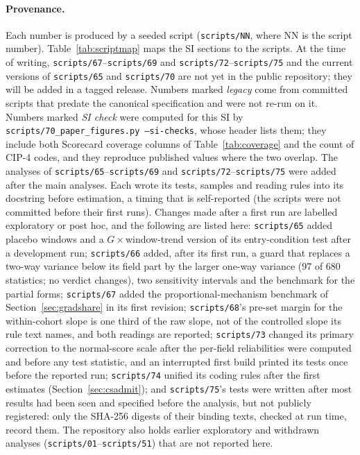 \documentclass[11pt]{article}
\newcommand{\scr}[1]{\texttt{scripts/#1}}
\begin{document}
\paragraph{Provenance.} Each number is produced by a seeded script (\scr{NN}, where NN is the script number).
Table~\ref{tab:scriptmap} maps the SI sections to the scripts. At the time of writing, \scr{67}--\scr{69} and
\scr{72}--\scr{75} and the current versions of \scr{65} and \scr{70} are not yet in the public repository; they will
be added in a tagged release. Numbers marked \emph{legacy} come from committed scripts that predate the canonical
specification and were not re-run on it. Numbers marked \emph{SI check} were computed for this SI by
\texttt{scripts/70\_paper\_figures.py --si-checks}, whose header lists them; they include both Scorecard coverage
columns of Table~\ref{tab:coverage} and the count of CIP-4 codes, and they reproduce published values where the two
overlap. The analyses of \scr{65}--\scr{69} and \scr{72}--\scr{75} were added after the main analyses. Each wrote
its tests, samples and reading rules into its docstring before estimation, a timing that is self-reported (the
scripts were not committed before their first runs). Changes made after a first run are labelled exploratory or
post hoc, and the following are listed here: \scr{65} added placebo windows and a $G\times$window-trend version of
its entry-condition test after a development run; \scr{66} added, after its first run, a guard that replaces a
two-way variance below its field part by the larger one-way variance (97 of 680 statistics; no verdict changes), two
sensitivity intervals and the benchmark for the partial forms; \scr{67} added the proportional-mechanism benchmark
of Section~\ref{sec:gradshare} in its first revision; \scr{68}'s pre-set margin for the within-cohort slope is one
third of the raw slope, not of the controlled slope its rule text names, and both readings are reported; \scr{73}
changed its primary correction to the normal-score scale after the per-field reliabilities were computed and before
any test statistic, and an interrupted first build printed its tests once before the reported run; \scr{74}
unified its coding rules after the first estimates (Section~\ref{sec:csadmit}); and \scr{75}'s tests were written after most results had been seen and specified before the analysis, but not
publicly registered: only the SHA-256 digests of their binding texts, checked at run time, record them. The repository also holds
earlier exploratory and withdrawn analyses (\scr{01}--\scr{51}) that are not reported here.
\end{document}
